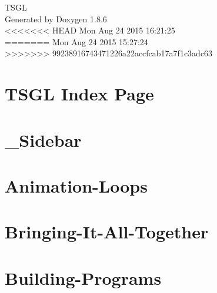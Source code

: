 \documentclass[twoside]{book}
\newcommand{\clearemptydoublepage}{%
  \newpage{\pagestyle{empty}\cleardoublepage}%
}
\begin{document}
\hypersetup{pageanchor=false}
\begin{titlepage}
\vspace*{7cm}
\begin{center}%
{\Large T\-S\-G\-L }\\
\vspace*{1cm}
{\large Generated by Doxygen 1.8.6}\\
\vspace*{0.5cm}
<<<<<<< HEAD
{\small Mon Aug 24 2015 16:21:25}\\
=======
{\small Mon Aug 24 2015 15:27:24}\\
>>>>>>> 99238916743471226a22accfcab17a7f1c3adc63
\end{center}
\end{titlepage}
\clearemptydoublepage
\tableofcontents
\clearemptydoublepage
{}
\hypersetup{pageanchor=true}

\chapter{T\-S\-G\-L Index Page}
\label{index}\hypertarget{index}{}
\chapter{\-\_\-\-Sidebar}
\label{md__home_kodemonkey__desktop__t_s_g_l_docs-wiki___sidebar}
\hypertarget{md__home_kodemonkey__desktop__t_s_g_l_docs-wiki___sidebar}{}

\chapter{Animation-\/\-Loops}
\label{md__home_kodemonkey__desktop__t_s_g_l_docs-wiki__animation-_loops}
\hypertarget{md__home_kodemonkey__desktop__t_s_g_l_docs-wiki__animation-_loops}{}

\chapter{Bringing-\/\-It-\/\-All-\/\-Together}
\label{md__home_kodemonkey__desktop__t_s_g_l_docs-wiki__bringing-_it-_all-_together}
\hypertarget{md__home_kodemonkey__desktop__t_s_g_l_docs-wiki__bringing-_it-_all-_together}{}

\chapter{Building-\/\-Programs}
\label{md__home_kodemonkey__desktop__t_s_g_l_docs-wiki__building-_programs}
\hypertarget{md__home_kodemonkey__desktop__t_s_g_l_docs-wiki__building-_programs}{}

\end{document}
